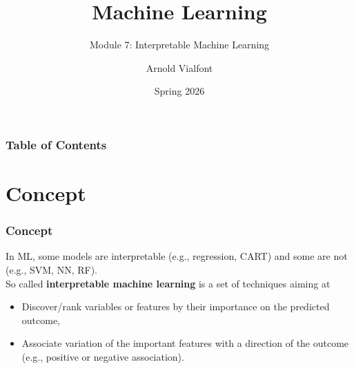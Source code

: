 
\title{Machine Learning}
\subtitle{Module 7: Interpretable Machine Learning}
\author[A. Vialfont]{Arnold Vialfont}
\date{Spring 2026}

\begin{frame}
  \titlepage
\end{frame}
\begin{frame}
\frametitle{Table of Contents}
	\tableofcontents
\end{frame}
\section{Concept}
\begin{frame}
\frametitle{Concept}
In ML, some models are interpretable (e.g., regression, CART) and some are not (e.g., SVM, NN, RF). \\
\vspace{0.3cm}
So called {\bf interpretable machine learning} is a set of techniques aiming at
\begin{itemize}
\item Discover/rank variables or features by their importance on the predicted outcome,
\item Associate variation of the important features with a direction of the outcome (e.g., positive or negative association).
\end{itemize}
\end{frame}

